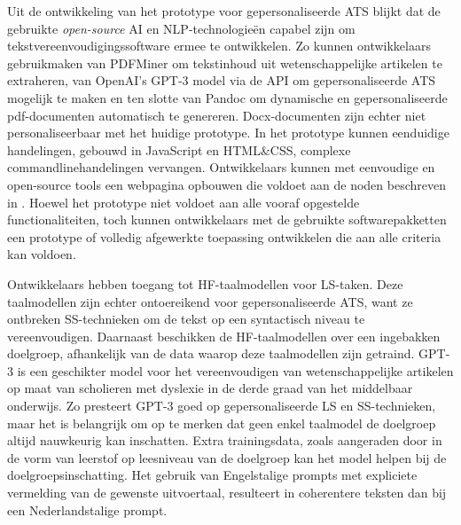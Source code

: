 \medspace

Uit de ontwikkeling van het prototype voor gepersonaliseerde ATS blijkt dat de gebruikte \textit{open-source} AI en NLP-technologieën capabel zijn om tekstvereenvoudigingssoftware ermee te ontwikkelen. Zo kunnen ontwikkelaars gebruikmaken van PDFMiner om tekstinhoud uit wetenschappelijke artikelen te extraheren, van OpenAI's GPT-3 model via de API om gepersonaliseerde ATS mogelijk te maken en ten slotte van Pandoc om dynamische en gepersonaliseerde pdf-documenten automatisch te genereren. Docx-documenten zijn echter niet personaliseerbaar met het huidige prototype. In het prototype kunnen eenduidige handelingen, gebouwd in JavaScript en HTML\&CSS, complexe commandlinehandelingen vervangen. Ontwikkelaars kunnen met eenvoudige en open-source tools een webpagina opbouwen die voldoet aan de noden beschreven in \textcite{Rello2012a}. Hoewel het prototype niet voldoet aan alle vooraf opgestelde functionaliteiten, toch kunnen ontwikkelaars met de gebruikte softwarepakketten een prototype of volledig afgewerkte toepassing ontwikkelen die aan alle criteria kan voldoen. 

\medspace

Ontwikkelaars hebben toegang tot HF-taalmodellen voor LS-taken. Deze taalmodellen zijn echter ontoereikend voor gepersonaliseerde ATS, want ze ontbreken SS-technieken om de tekst op een syntactisch niveau te vereenvoudigen. Daarnaast beschikken de HF-taalmodellen over een ingebakken doelgroep, afhankelijk van de data waarop deze taalmodellen zijn getraind. GPT-3 is een geschikter model voor het vereenvoudigen van wetenschappelijke artikelen op maat van scholieren met dyslexie in de derde graad van het middelbaar onderwijs. Zo presteert GPT-3 goed op gepersonaliseerde LS en SS-technieken, maar het is belangrijk om op te merken dat geen enkel taalmodel de doelgroep altijd nauwkeurig kan inschatten. Extra trainingsdata, zoals aangeraden door \textcite{Gooding2022} in de vorm van leerstof op leesniveau van de doelgroep kan het model helpen bij de doelgroepsinschatting. Het gebruik van Engelstalige prompts met expliciete vermelding van de gewenste uitvoertaal, resulteert in coherentere teksten dan bij een Nederlandstalige prompt.